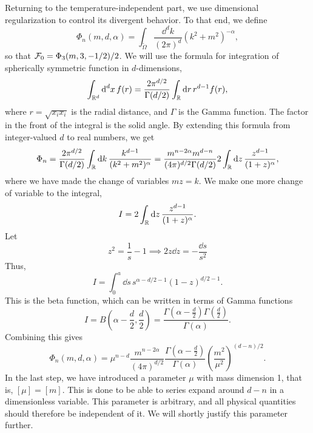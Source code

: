 Returning to the temperature-independent part, we use dimensional regularization to control its divergent behavior.
To that end, we define
\begin{equation}
    \label{def dimreg integral}
    \Phi_n(m, d, \alpha) 
    = \int_{\tilde \Omega} \frac{\dd^d k}{(2 \pi)^d} (k^2 + m^2)^{-\alpha},
\end{equation}
so that $\mathcal{F}_0 = \Phi_3(m, 3, -1/2) / 2$.
We will use the formula for integration of spherically symmetric function in $d$-dimensions,
\begin{equation}
    \int_{\mathbb{R}^d} \text{d}^d x \, f(r) 
    = \frac{2 \pi^{d/2}}{\Gamma(d/2)} \int_{\mathbb{R}} \text{d} r \, r^{d-1}f(r),
\end{equation}
where $r = \sqrt{x_i x_i}$ is the radial distance, and $\Gamma$ is the Gamma function.
The factor in the front of the integral is the solid angle.
By extending this formula from integer-valued $d$ to real numbers, we get
\begin{equation}
    \Phi_n
    = \frac{2 \pi^{d/2} }{\Gamma(d/2)} \int_{\mathbb{R}} \text{d} k \, 
    \frac{k^{d-1}}{(k^2 + m^2)^\alpha}
    = \frac{m^{n-2\alpha}m^{d-n} }{(4 \pi)^{d / 2}\Gamma(d/2)} 
    2 \int_{\mathbb{R}} \text{d} z \, \frac{z^{d - 1}}{(1 + z)^\alpha}, 
\end{equation}
where we have made the change of variables $m z = k$.
We make one more change of variable to the integral,
\begin{equation}
    I = 2 \int_{\mathbb{R}} \text{d} z \, \frac{z^{d - 1}}{(1 + z)^\alpha}.
\end{equation}
Let
\begin{equation}
    z^2 = \frac{1}{s} - 1 \implies 2 z \dd z = - \frac{\dd s}{s^2}
\end{equation}
Thus,
\begin{equation}
    I = \int_0^a \dd s \, s^{\alpha - d/2 - 1} (1 - z)^{d/2 - 1}.
\end{equation}
This is the beta function, which can be written in terms of Gamma functions~
\autocite{peskinIntroductionQuantumField1995}
\begin{equation}
    I = B\left(\alpha - \frac{d}{2}, \frac{d}{2}\right) 
    = \frac{\Gamma\left(\alpha - \frac{d}{2}\right) \Gamma\left(\frac{d}{2}\right)}{\Gamma(\alpha)}.
\end{equation}
Combining this gives
\begin{equation}
    \label{result dimreg}
    \Phi_n(m, d, \alpha) 
    = \mu^{n-d} \frac{m^{n - 2\alpha}}{(4 \pi)^{d / 2}}
    \frac{
        \Gamma \left(\alpha - \frac{d}{2} \right) 
    }
    {\Gamma(\alpha)}
    \left(\frac{m^2}{\mu^2}\right)^{(d-n)/2 }
    .
\end{equation}
In the last step, we have introduced a parameter $\mu$ with mass dimension 1, that is, $[\mu] = [m]$.
This is done to be able to series expand around $d - n$ in a dimensionless variable. 
This parameter is arbitrary, and all physical quantities should therefore be independent of it.
We will shortly justify this parameter further.


